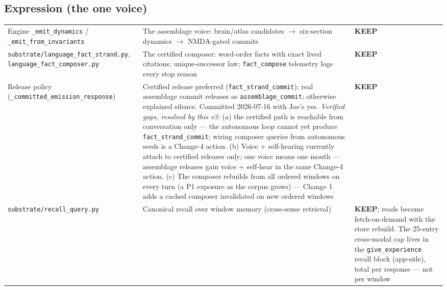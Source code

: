 \documentclass[11pt]{article}
\newcommand{\keep}{\textbf{KEEP}}
\begin{document}
\subsection{Expression (the one voice)}
\begin{longtable}{p{} p{} p{}}
\toprule
Engine \texttt{\_emit\_dynamics} / \texttt{\_emit\_from\_invariants} &
The assemblage voice: brain/atlas candidates $\to$ six-section dynamics
$\to$ NMDA-gated commits &
\keep{} \\
\texttt{substrate/language\_fact\_strand.py},
\texttt{language\_fact\_composer.py} &
The certified composer: word-order facts with exact lived citations;
unique-successor law; \texttt{fact\_compose} telemetry logs every stop
reason &
\keep{} \\
Release policy (\texttt{\_committed\_emission\_response}) &
Certified release preferred (\texttt{fact\_strand\_commit}); real
assemblage commit releases as \texttt{assemblage\_commit}; otherwise
explained silence. Committed 2026-07-16 with Joe's yes.
\emph{Verified gaps, resolved by this v3:} (a) the certified path is
reachable from conversation only — the autonomous loop cannot yet produce
\texttt{fact\_strand\_commit}; wiring composer queries from autonomous
seeds is a Change-4 action. (b) Voice + self-hearing currently attach to
certified releases only; one voice means one mouth — assemblage releases
gain voice + self-hear in the same Change-4 action. (c) The composer
rebuilds from all ordered windows on every turn (a P1 exposure as the
corpus grows) — Change 1 adds a cached composer invalidated on new
ordered windows &
\keep{} \\
\texttt{substrate/recall\_query.py} &
Canonical recall over window memory (cross-sense retrieval) &
\keep{}; reads become fetch-on-demand with the store rebuild. The
25-entry cross-modal cap lives in the \texttt{give\_experience} recall
block (app-side), total per response — not per window \\
\bottomrule
\end{longtable}
\end{document}

